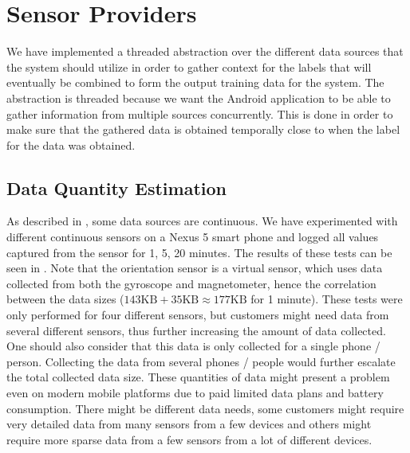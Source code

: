 
\section{Sensor Providers}
\label{sec:sensor_providers}

We have implemented a threaded abstraction over the different data sources that the system should utilize in order to gather context for the labels that will eventually be combined to form the output training data for the system. The abstraction is threaded because we want the Android application to be able to gather information from multiple sources concurrently. This is done in order to make sure that the gathered data is obtained temporally close to when the label for the data was obtained. 

\subsection{Data Quantity Estimation}
\label{sub:data_quantity_estimation}

As described in , some data sources are continuous. We have experimented with different continuous sensors on a Nexus 5 smart phone and logged all values captured from the sensor for 1, 5, 20 minutes. The results of these tests can be seen in . Note that the orientation sensor is a virtual sensor, which uses data collected from both the gyroscope and magnetometer, hence the correlation between the data sizes ($143 \text{KB} + 35  \text{KB} \approx 177  \text{KB}$ for 1 minute). These tests were only performed for four different sensors, but customers might need data from several different sensors, thus further increasing the amount of data collected. One should also consider that this data is only collected for a single phone / person. Collecting the data from several phones / people would further escalate the total collected data size. These quantities of data might present a problem even on modern mobile platforms due to paid limited data plans and battery consumption. There might be different data needs, some customers might require very detailed data from many sensors from a few devices and others might require more sparse data from a few sensors from a lot of different devices. 

